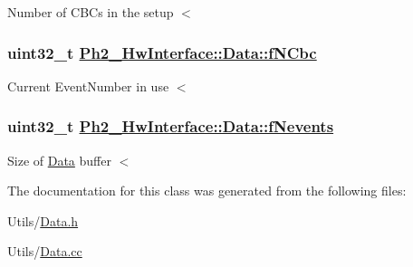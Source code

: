 Number of CBCs in the setup $<$ \hypertarget{class_ph2___hw_interface_1_1_data_ad1da032576bebc3351e8b900bbfddca}{
\subsubsection[fNCbc]{\setlength{\rightskip}{0pt plus 5cm}uint32\_\-t \hyperlink{class_ph2___hw_interface_1_1_data_ad1da032576bebc3351e8b900bbfddca}{Ph2\_\-Hw\-Interface::Data::f\-NCbc}}}
\label{class_ph2___hw_interface_1_1_data_ad1da032576bebc3351e8b900bbfddca}


Current Event\-Number in use $<$ \hypertarget{class_ph2___hw_interface_1_1_data_c27abb30ceb327ce0fc4245caaf0b3d5}{
\subsubsection[fNevents]{\setlength{\rightskip}{0pt plus 5cm}uint32\_\-t \hyperlink{class_ph2___hw_interface_1_1_data_c27abb30ceb327ce0fc4245caaf0b3d5}{Ph2\_\-Hw\-Interface::Data::f\-Nevents}}}
\label{class_ph2___hw_interface_1_1_data_c27abb30ceb327ce0fc4245caaf0b3d5}


Size of \hyperlink{class_ph2___hw_interface_1_1_data}{Data} buffer $<$ 

The documentation for this class was generated from the following files:\begin{CompactItemize}
\item 
Utils/\hyperlink{_data_8h}{Data.h}\item 
Utils/\hyperlink{_data_8cc}{Data.cc}\end{CompactItemize}
